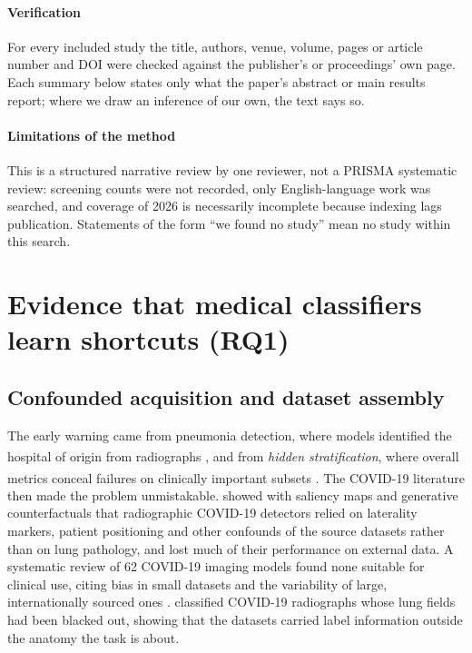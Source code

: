 \documentclass[11pt,a4paper]{article}
\newcommand{\bg}{\textsuperscript{\dag}}
\begin{document}
\paragraph{Verification} For every included study the title, authors, venue, volume, pages or article number and DOI
were checked against the publisher's or proceedings' own page. Each summary below states only what the paper's
abstract or main results report; where we draw an inference of our own, the text says so.

\paragraph{Limitations of the method} This is a structured narrative review by one reviewer, not a PRISMA systematic
review: screening counts were not recorded, only English-language work was searched, and coverage of 2026 is
necessarily incomplete because indexing lags publication. Statements of the form ``we found no study'' mean no study
within this search.

\section{Evidence that medical classifiers learn shortcuts (RQ1)}\label{sec:evidence}
\subsection{Confounded acquisition and dataset assembly}
The early warning came from pneumonia detection, where models identified the hospital of origin from radiographs
\citep{zech2018variable}\bg, and from \emph{hidden stratification}, where overall metrics conceal failures on
clinically important subsets \citep{oakden2020hidden}\bg. The COVID-19 literature then made the problem unmistakable.
\citet{degrave2021ai} showed with saliency maps and generative counterfactuals that radiographic COVID-19 detectors
relied on laterality markers, patient positioning and other confounds of the source datasets rather than on lung
pathology, and lost much of their performance on external data. A systematic review of 62 COVID-19 imaging models found
none suitable for clinical use, citing bias in small datasets and the variability of large, internationally sourced
ones \citep{roberts2021pitfalls}.
\citet{maguolo2021critic} classified COVID-19 radiographs whose lung fields had been blacked out, showing that the
datasets carried label information outside the anatomy the task is about.
\end{document}
